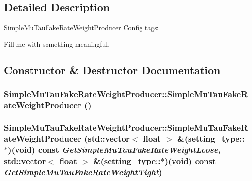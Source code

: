 \subsection{Detailed Description}
\hyperlink{classSimpleMuTauFakeRateWeightProducer}{SimpleMuTauFakeRateWeightProducer} Config tags:
\begin{DoxyItemize}
\item Fill me with something meaningful. 
\end{DoxyItemize}

\subsection{Constructor \& Destructor Documentation}
\hypertarget{classSimpleMuTauFakeRateWeightProducer_ae3ec7f5119239f3b455485c93c66c094}{
\subsubsection[{SimpleMuTauFakeRateWeightProducer}]{\setlength{\rightskip}{0pt plus 5cm}SimpleMuTauFakeRateWeightProducer::SimpleMuTauFakeRateWeightProducer ()}}
\label{classSimpleMuTauFakeRateWeightProducer_ae3ec7f5119239f3b455485c93c66c094}
\hypertarget{classSimpleMuTauFakeRateWeightProducer_ab156e0e55bda16af0018394f2b3cd774}{
\subsubsection[{SimpleMuTauFakeRateWeightProducer}]{\setlength{\rightskip}{0pt plus 5cm}SimpleMuTauFakeRateWeightProducer::SimpleMuTauFakeRateWeightProducer (std::vector$<$ float $>$ \&(setting\_\-type::$\ast$)(void) const  {\em GetSimpleMuTauFakeRateWeightLoose}, \/  std::vector$<$ float $>$ \&(setting\_\-type::$\ast$)(void) const  {\em GetSimpleMuTauFakeRateWeightTight})}}
\label{classSimpleMuTauFakeRateWeightProducer_ab156e0e55bda16af0018394f2b3cd774}



